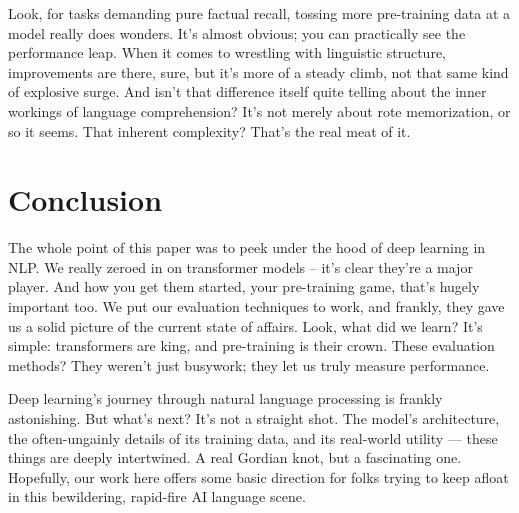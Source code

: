 \documentclass{article}
\begin{document}
Look, for tasks demanding pure factual recall, tossing more pre-training data at a model really does wonders. It’s almost obvious; you can practically see the performance leap. When it comes to wrestling with linguistic structure, improvements are there, sure, but it’s more of a steady climb, not that same kind of explosive surge. And isn’t that difference itself quite telling about the inner workings of language comprehension? It’s not merely about rote memorization, or so it seems. That inherent complexity? That’s the real meat of it.

\section{Conclusion}

The whole point of this paper was to peek under the hood of deep learning in NLP. We really zeroed in on transformer models – it’s clear they’re a major player. And how you get them started, your pre-training game, that’s hugely important too. We put our evaluation techniques to work, and frankly, they gave us a solid picture of the current state of affairs. Look, what did we learn? It's simple: transformers are king, and pre-training is their crown. These evaluation methods? They weren't just busywork; they let us truly measure performance.

Deep learning's journey through natural language processing is frankly astonishing. But what's next? It's not a straight shot. The model's architecture, the often-ungainly details of its training data, and its real-world utility — these things are deeply intertwined. A real Gordian knot, but a fascinating one. Hopefully, our work here offers some basic direction for folks trying to keep afloat in this bewildering, rapid-fire AI language scene.



\end{document}
